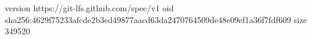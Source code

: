 version https://git-lfs.github.com/spec/v1
oid sha256:4629f75233afcde2b3ed49877aacd63da2470764509de48e09ef1a36f7fdf609
size 349520

